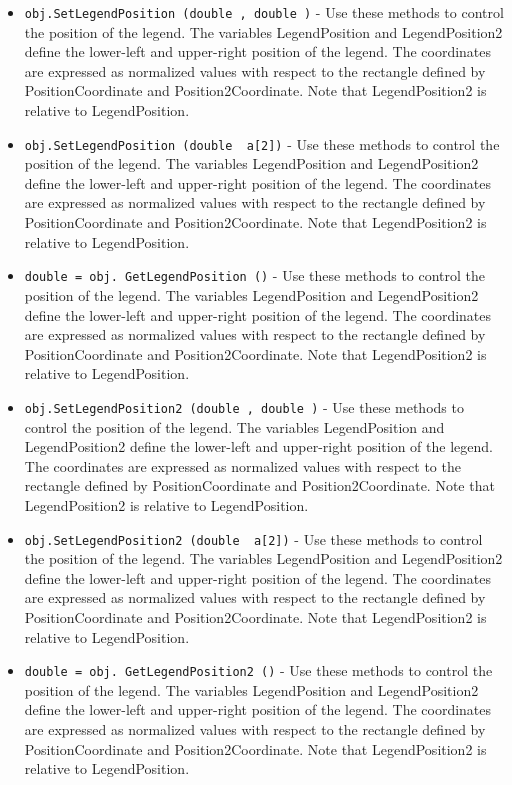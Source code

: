 \begin{itemize}
\item  \verb|obj.SetLegendPosition (double , double )| -  Use these methods to control the position of the legend. The variables
 LegendPosition and LegendPosition2 define the lower-left and upper-right
 position of the legend. The coordinates are expressed as normalized
 values with respect to the rectangle defined by PositionCoordinate and
 Position2Coordinate. Note that LegendPosition2 is relative to
 LegendPosition.

\item  \verb|obj.SetLegendPosition (double  a[2])| -  Use these methods to control the position of the legend. The variables
 LegendPosition and LegendPosition2 define the lower-left and upper-right
 position of the legend. The coordinates are expressed as normalized
 values with respect to the rectangle defined by PositionCoordinate and
 Position2Coordinate. Note that LegendPosition2 is relative to
 LegendPosition.

\item  \verb|double = obj. GetLegendPosition ()| -  Use these methods to control the position of the legend. The variables
 LegendPosition and LegendPosition2 define the lower-left and upper-right
 position of the legend. The coordinates are expressed as normalized
 values with respect to the rectangle defined by PositionCoordinate and
 Position2Coordinate. Note that LegendPosition2 is relative to
 LegendPosition.

\item  \verb|obj.SetLegendPosition2 (double , double )| -  Use these methods to control the position of the legend. The variables
 LegendPosition and LegendPosition2 define the lower-left and upper-right
 position of the legend. The coordinates are expressed as normalized
 values with respect to the rectangle defined by PositionCoordinate and
 Position2Coordinate. Note that LegendPosition2 is relative to
 LegendPosition.

\item  \verb|obj.SetLegendPosition2 (double  a[2])| -  Use these methods to control the position of the legend. The variables
 LegendPosition and LegendPosition2 define the lower-left and upper-right
 position of the legend. The coordinates are expressed as normalized
 values with respect to the rectangle defined by PositionCoordinate and
 Position2Coordinate. Note that LegendPosition2 is relative to
 LegendPosition.

\item  \verb|double = obj. GetLegendPosition2 ()| -  Use these methods to control the position of the legend. The variables
 LegendPosition and LegendPosition2 define the lower-left and upper-right
 position of the legend. The coordinates are expressed as normalized
 values with respect to the rectangle defined by PositionCoordinate and
 Position2Coordinate. Note that LegendPosition2 is relative to
 LegendPosition.


\end{itemize}
